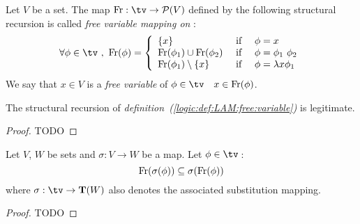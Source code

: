 \begin{defin}\label{logic:def:LAM:free:variable}
    Let $V$ be a set. The map $\free:\tv\to {\cal P}(V)$ defined by the
    following structural recursion is called {\em free variable mapping on \tv}:
    \begin{equation}\label{logic:eqn:LAM:free:var:recursion}
        \forall\phi\in\tv\ ,\ 
            \free(\phi) =
                \left\{\begin{array}{lcl}
                    \{x\}&\mbox{\ if\ }&\phi=x
                    \\
                    \free(\phi_{1})\cup\free(\phi_{2}) 
                        &\mbox{\ if\ }&
                    \phi=\phi_{1}\ \phi_{2}
                    \\
                    \free(\phi_{1})\setminus\{x\}
                        &\mbox{\ if\ }&
                    \phi=\lambda x\phi_{1}
                \end{array}\right.
    \end{equation}
    We say that $x\in V$ is a {\em free variable} of $\phi\in\tv$ 
    \ifand\ $x\in\mbox{\rm Fr}(\phi)$.
\end{defin}
\begin{prop}\label{logic:prop:LAM:free:variable}
    The structural recursion of 
    {\em definition~(\ref{logic:def:LAM:free:variable})} is legitimate.
\end{prop}
\begin{proof}
TODO
\end{proof}

\begin{prop}\label{logic:prop:LAM:freevar:of:substitution:inclusion}
    Let $V$, $W$ be sets and $\sigma:V\to W$ be a map. Let
    $\phi\in\tv$\,:
    \[
        \mbox{\rm Fr}(\sigma(\phi))\subseteq\sigma(\mbox{\rm Fr}(\phi))
    \]
    where $\sigma:\tv\to{\bf T}(W)$ also denotes the associated substitution 
    mapping.
\end{prop}
\begin{proof}
TODO
\end{proof}

